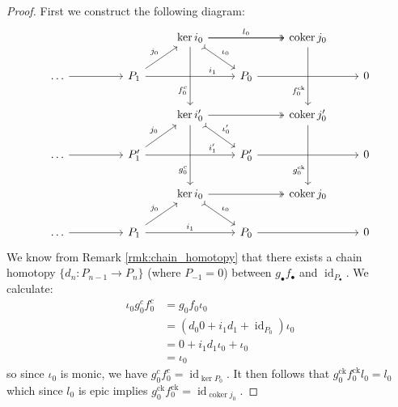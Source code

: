 \documentclass[12pt]{article}
\theoremstyle{plain}
\theoremstyle{definition}
\newcommand{\lto}{\longrightarrow}
\begin{document}
\begin{proof}




First we construct the following diagram:
\begin{equation}
\begin{tikzcd}
& & & \operatorname{ker}i_0\arrow[rr,twoheadrightarrow]\arrow[dr,rightarrowtail,"{\iota_0}"]\arrow[dd,swap,near end, "{f_0^c}"]\arrow[rr,"{l_0}"] & & \operatorname{coker}j_0\arrow[dd,swap,near end, "{f_0^{\text{ck}}}"]\\
\hdots\arrow[rr] & & P_1\arrow[ur,"{j_0}"]\arrow[rr,near end,"{i_1}"] & & P_0\arrow[rr] & & 0\\
& & & \operatorname{ker}i_0'\arrow[rr,twoheadrightarrow]\arrow[dr,rightarrowtail,"{\iota_0'}"]\arrow[dd,swap,near end, "{g_0^c}"] & & \operatorname{coker}j_0'\arrow[dd,swap,near end, "{g_0^{\text{ck}}}"]\\
\hdots\arrow[rr] & & P_1'\arrow[ur,"{j_0}"]\arrow[rr,near end,"{i_1'}"] & & P_0'\arrow[rr]  & & 0\\
& & & \operatorname{ker}i_0\arrow[rr,twoheadrightarrow]\arrow[dr,rightarrowtail,"{\iota_0}"] & & \operatorname{coker}j_0\\
\hdots\arrow[rr] & & P_1\arrow[ur,"{j_0}"]\arrow[rr,"{i_1}"] & & P_0\arrow[rr] & & 0
\end{tikzcd}
\end{equation}
We know from Remark \ref{rmk:chain_homotopy} that there exists a chain homotopy $\lbrace d_n: P_{n-1} \lto P_n\rbrace$ (where $P_{-1} = 0$) between $g_\bullet f_\bullet$ and $\operatorname{id}_{P_\bullet}$. We calculate:
\begin{align*}
\iota_0g_0^cf_0^c &= g_0f_0\iota_0\\
&= (d_0 0 + i_1 d_1 + \operatorname{id}_{P_0})\iota_0\\
&= 0 + i_1d_1\iota_0 + \iota_0\\
&= \iota_0
\end{align*}
so since $\iota_0$ is monic, we have $g_0^cf_0^c = \operatorname{id}_{\operatorname{ker}P_0}$. It then follows that $g_0^{\text{ck}}f_0^{\text{ck}} l_0= l_0$ which since $l_0$ is epic implies $g_0^{\text{ck}}f_0^{\text{ck}} = \operatorname{id}_{\operatorname{coker}j_0}$.


\end{proof}
\end{document}
